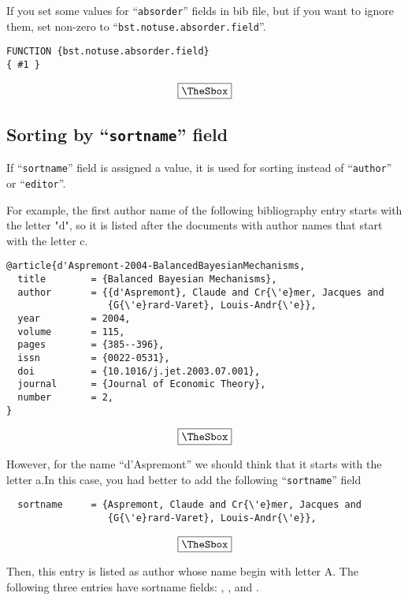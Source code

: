 \documentclass[10pt]{article}
\newenvironment{Frame}%
{\setlength{\fboxsep}{15pt}
\setlength{\mylength}{\linewidth}%
\addtolength{\mylength}{-2\fboxsep}%
\addtolength{\mylength}{-2\fboxrule}%
\Sbox
\minipage{\mylength}%
\setlength{\abovedisplayskip}{0pt}%
\setlength{\belowdisplayskip}{0pt}%
}%
{\endminipage\endSbox
\[\fbox{\TheSbox}\]}
\begin{document}
If you set some values for ``\texttt{absorder}'' fields in bib file,
but if you want to ignore them, set non-zero to
``\texttt{bst.notuse.absorder.field}''.
\begin{Frame}
\begin{verbatim}
FUNCTION {bst.notuse.absorder.field}
{ #1 }
\end{verbatim}
\end{Frame}

\subsection{Sorting by ``\texttt{sortname}'' field}

If ``\texttt{sortname}'' field is assigned a value, it is used for sorting
instead of ``\texttt{author}'' or ``\texttt{editor}''.

For example, the first author name of the following bibliography
entry starts with the letter "d", so it is listed after the
documents with author names that start with the letter c.
\begin{Frame}
\begin{verbatim}
@article{d'Aspremont-2004-BalancedBayesianMechanisms,
  title        = {Balanced Bayesian Mechanisms},
  author       = {{d'Aspremont}, Claude and Cr{\'e}mer, Jacques and
                  {G{\'e}rard-Varet}, Louis-Andr{\'e}},
  year         = 2004,
  volume       = 115,
  pages        = {385--396},
  issn         = {0022-0531},
  doi          = {10.1016/j.jet.2003.07.001},
  journal      = {Journal of Economic Theory},
  number       = 2,
}
\end{verbatim}
\end{Frame}

However, for the name ``d'Aspremont'' we should think that it starts with the
letter a.In this case, you had better to add the following ``\texttt{sortname}''
field
\begin{Frame}
\begin{verbatim}
  sortname     = {Aspremont, Claude and Cr{\'e}mer, Jacques and
                  {G{\'e}rard-Varet}, Louis-Andr{\'e}},
\end{verbatim}
\end{Frame}

Then, this entry is listed as author whose name begin with letter A. The
following three entries have sortname fields:
\citet{d'Aspremont-2004-BalancedBayesianMechanisms},
\citet{d'Aspremont-2003-CorrelationIndependenceAndBayesian}, and
\citet{d'Aspremont-1998-LinearInequalityMethodsTo}.
\end{document}
